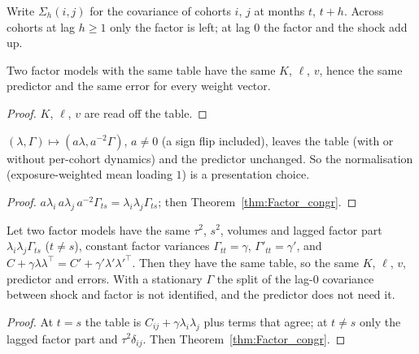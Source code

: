 Write $\Sigma_h(i,j)$ for the covariance of cohorts $i$, $j$ at months $t$, $t + h$. Across
cohorts at lag $h \ge 1$ only the factor is left; at lag $0$ the factor and the shock add up.

\begin{theorem}\label{thm:Factor_congr}
  \leanok
  Two factor models with the same table have the same $K$, $\ell$, $v$, hence the same
  predictor and the same error for every weight vector.
\end{theorem}
\begin{proof}
  \leanok
  $K$, $\ell$, $v$ are read off the table.
\end{proof}

\begin{theorem}\label{thm:Factor_rescale}
  \leanok
  $(\lambda, \Gamma) \mapsto (a\lambda, a^{-2}\Gamma)$, $a \ne 0$ (a sign flip included), leaves
  the table (with or without per-cohort dynamics) and the predictor unchanged. So the
  normalisation (exposure-weighted mean loading $1$) is a presentation choice.
\end{theorem}
\begin{proof}
  \leanok
  $a\lambda_i\,a\lambda_j\,a^{-2}\Gamma_{ts} = \lambda_i\lambda_j\Gamma_{ts}$; then
  Theorem~\ref{thm:Factor_congr}.
\end{proof}

\begin{theorem}\label{thm:Factor_lag0}
  \leanok
  Let two factor models have the same $\tau^2$, $s^2$, volumes and lagged factor part
  $\lambda_i\lambda_j\Gamma_{ts}$ ($t \ne s$), constant factor variances $\Gamma_{tt} = \gamma$,
  $\Gamma'_{tt} = \gamma'$, and $C + \gamma\lambda\lambda^\top = C' + \gamma'\lambda'\lambda'^\top$.
  Then they have the same table, so the same $K$, $\ell$, $v$, predictor and errors. With a
  stationary $\Gamma$ the split of the lag-$0$ covariance between shock and factor is not
  identified, and the predictor does not need it.
\end{theorem}
\begin{proof}
  \leanok
  At $t = s$ the table is $C_{ij} + \gamma\lambda_i\lambda_j$ plus terms that agree; at
  $t \ne s$ only the lagged factor part and $\tau^2\delta_{ij}$. Then
  Theorem~\ref{thm:Factor_congr}.
\end{proof}

